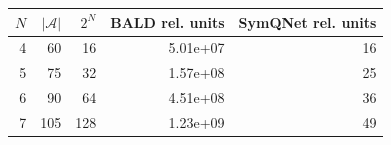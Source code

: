 \begin{tabular}{rrrrr}
\toprule
$N$ & $|\mathcal{A}|$ & $2^N$ & BALD rel. units & SymQNet rel. units \\
\midrule
4 & 60 & 16 & 5.01e+07 & 16 \\
5 & 75 & 32 & 1.57e+08 & 25 \\
6 & 90 & 64 & 4.51e+08 & 36 \\
7 & 105 & 128 & 1.23e+09 & 49 \\
\bottomrule
\end{tabular}
